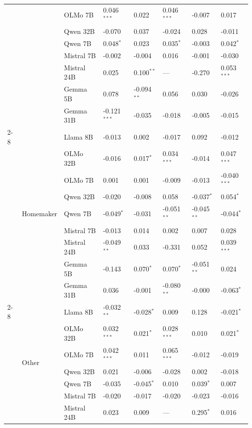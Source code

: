 \begin{longtable}[t]{llllllll}
 &  & OLMo 7B & 0.046$^{***}$ & 0.022 & 0.046$^{***}$ & -0.007 & 0.017 \\
 &  & Qwen 32B & -0.070 & 0.037 & -0.024 & 0.028 & -0.011 \\
 &  & Qwen 7B & 0.048$^{*}$ & 0.023 & 0.035$^{*}$ & -0.003 & 0.042$^{*}$ \\
 &  & Mistral 7B & -0.002 & -0.004 & 0.016 & -0.001 & -0.030 \\
 &  & Mistral 24B & 0.025 & 0.100$^{**}$ & --- & -0.270 & 0.053$^{***}$ \\
 &  & Gemma 5B & 0.078 & -0.094$^{**}$ & 0.056 & 0.030 & -0.026 \\
 &  & Gemma 31B & -0.121$^{***}$ & -0.035 & -0.018 & -0.005 & -0.015 \\
\cline{2-8}
 & \multirow[t]{9}{*}{Homemaker} & Llama 8B & -0.013 & 0.002 & -0.017 & 0.092 & -0.012 \\
 &  & OLMo 32B & -0.016 & 0.017$^{*}$ & 0.034$^{***}$ & -0.014 & 0.047$^{***}$ \\
 &  & OLMo 7B & 0.001 & 0.001 & -0.009 & -0.013 & -0.040$^{***}$ \\
 &  & Qwen 32B & -0.020 & -0.008 & 0.058 & -0.037$^{*}$ & 0.054$^{*}$ \\
 &  & Qwen 7B & -0.049$^{*}$ & -0.031 & -0.051$^{**}$ & -0.045$^{**}$ & -0.044$^{*}$ \\
 &  & Mistral 7B & -0.013 & 0.014 & 0.002 & 0.007 & 0.028 \\
 &  & Mistral 24B & -0.049$^{**}$ & 0.033 & -0.331 & 0.052 & 0.039$^{***}$ \\
 &  & Gemma 5B & -0.143 & 0.070$^{*}$ & 0.070$^{*}$ & -0.051$^{**}$ & 0.024 \\
 &  & Gemma 31B & 0.036 & -0.001 & -0.080$^{**}$ & -0.000 & -0.063$^{*}$ \\
\cline{2-8}
 & \multirow[t]{9}{*}{Other} & Llama 8B & -0.032$^{**}$ & -0.028$^{*}$ & 0.009 & 0.128 & -0.021$^{*}$ \\
 &  & OLMo 32B & 0.032$^{***}$ & 0.021$^{*}$ & 0.028$^{***}$ & 0.010 & 0.021$^{*}$ \\
 &  & OLMo 7B & 0.042$^{***}$ & 0.011 & 0.065$^{***}$ & -0.012 & -0.019 \\
 &  & Qwen 32B & 0.021 & -0.006 & -0.028 & 0.002 & -0.018 \\
 &  & Qwen 7B & -0.035 & -0.045$^{*}$ & 0.010 & 0.039$^{*}$ & 0.007 \\
 &  & Mistral 7B & -0.020 & -0.017 & -0.020 & -0.023 & -0.016 \\
 &  & Mistral 24B & 0.023 & 0.009 & --- & 0.295$^{*}$ & 0.016 \\

\end{longtable}
